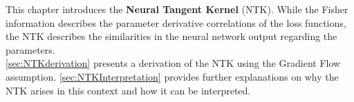 This chapter introduces the \textbf{Neural Tangent Kernel} (NTK). While the Fisher information describes the parameter derivative correlations of the loss functions, the NTK describes the similarities in the neural network output regarding the parameters.\\
\cref{sec:NTKderivation} presents a derivation of the NTK using the Gradient Flow assumption. \cref{sec:NTKInterpretation} provides further explanations on why the NTK arises in this context and how it can be interpreted.